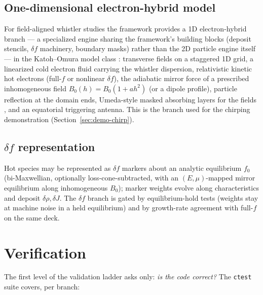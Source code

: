 \documentclass[11pt]{article}
\begin{document}
\subsection{One-dimensional electron-hybrid model}
\label{sec:model-hybrid}
For field-aligned whistler studies the framework provides a 1D
electron-hybrid branch --- a specialized engine sharing the framework's
building blocks (deposit stencils, $\delta f$ machinery, boundary masks)
rather than the 2D particle engine itself --- in the Katoh--Omura model
class
\cite{katoh2007,omura2021}: transverse fields on a staggered 1D grid,
a linearized cold electron fluid carrying the whistler dispersion,
relativistic kinetic hot electrons (full-$f$ or nonlinear $\delta f$),
the adiabatic mirror force of a prescribed inhomogeneous field
$B_0(h)=B_{0}(1+ah^2)$ (or a dipole profile), particle reflection at
the domain ends, Umeda-style masked absorbing layers for the fields
\cite{umeda2001}, and an equatorial triggering antenna. This is the
branch used for the chirping demonstration
(Section~\ref{sec:demo-chirp}).

\subsection{$\delta f$ representation}
\label{sec:model-deltaf}
Hot species may be represented as $\delta f$ markers about an analytic
equilibrium $f_0$ (bi-Maxwellian, optionally loss-cone-subtracted, with
an $(E,\mu)$-mapped mirror equilibrium along inhomogeneous $B_0$);
marker weights evolve along characteristics and deposit
$\delta\rho,\delta J$. The $\delta f$ branch is gated by equilibrium-hold
tests (weights stay at machine noise in a held equilibrium) and by
growth-rate agreement with full-$f$ on the same deck.

\section{Verification}
\label{sec:verify}

The first level of the validation ladder asks only: \emph{is the code
correct?} The \texttt{ctest} suite covers, per branch:
\end{document}
